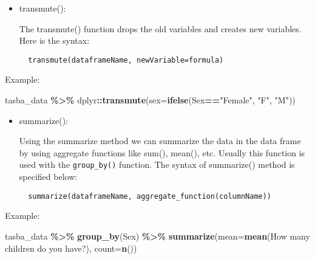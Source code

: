 \documentclass[
]{book}
\newenvironment{Shaded}{\begin{snugshade}}{\end{snugshade}}
\newcommand{\AttributeTok}[1]{\textcolor[rgb]{0.13,0.29,0.53}{#1}}
\newcommand{\FunctionTok}[1]{\textcolor[rgb]{0.13,0.29,0.53}{\textbf{#1}}}
\newcommand{\NormalTok}[1]{#1}
\newcommand{\SpecialCharTok}[1]{\textcolor[rgb]{0.81,0.36,0.00}{\textbf{#1}}}
\newcommand{\StringTok}[1]{\textcolor[rgb]{0.31,0.60,0.02}{#1}}
\begin{document}
\begin{itemize}
\item
  transmute():

  The transmute() function drops the old variables and creates new variables. Here is the syntax:

\begin{verbatim}
  transmute(dataframeName, newVariable=formula)
\end{verbatim}
\end{itemize}

Example:

\begin{Shaded}
\begin{Highlighting}[]
\NormalTok{tasba\_data }\SpecialCharTok{\%\textgreater{}\%}
\NormalTok{  dplyr}\SpecialCharTok{::}\FunctionTok{transmute}\NormalTok{(}\AttributeTok{sex=}\FunctionTok{ifelse}\NormalTok{(Sex}\SpecialCharTok{==}\StringTok{"Female"}\NormalTok{, }\StringTok{"F"}\NormalTok{, }\StringTok{"M"}\NormalTok{))}
\end{Highlighting}
\end{Shaded}

\begin{itemize}
\item
  summarize():

  Using the summarize method we can summarize the data in the data frame by using aggregate functions like sum(), mean(), etc. Usually this function is used with the \texttt{group\_by()} function. The syntax of summarize() method is specified below:

\begin{verbatim}
  summarize(dataframeName, aggregate_function(columnName))
\end{verbatim}
\end{itemize}

Example:

\begin{Shaded}
\begin{Highlighting}[]
\NormalTok{tasba\_data }\SpecialCharTok{\%\textgreater{}\%}
  \FunctionTok{group\_by}\NormalTok{(Sex) }\SpecialCharTok{\%\textgreater{}\%}
  \FunctionTok{summarize}\NormalTok{(}\AttributeTok{mean=}\FunctionTok{mean}\NormalTok{(}\StringTok{\textasciigrave{}}\AttributeTok{How many children do you have?}\StringTok{\textasciigrave{}}\NormalTok{), }\AttributeTok{count=}\FunctionTok{n}\NormalTok{())}
\end{Highlighting}
\end{Shaded}
\end{document}
